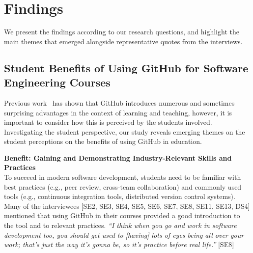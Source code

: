 \section{Findings} %
\label{sec:Findings}

We present the findings according to our research questions, and highlight the main themes that emerged alongside representative quotes from the interviews.

\subsection{Student Benefits of Using GitHub for Software Engineering Courses}
Previous work~\cite{zagalsky2015emergence} has shown that GitHub introduces numerous and sometimes surprising advantages in the context of learning and teaching, however, it is important to consider how this is perceived by the students involved. Investigating the student perspective, our study reveals emerging themes on the student perceptions on the benefits of using GitHub in education.


\textbf{Benefit: Gaining and Demonstrating Industry-Relevant Skills and Practices}\\
To succeed in modern software development, students need to be familiar with best practices (e.g., peer review, cross-team collaboration) and commonly used tools (e.g., continuous integration tools, distributed version control systems). Many of the interviewees [SE2, SE3, SE4, SE5, SE6, SE7, SE8, SE11, SE13, DS4] mentioned that using GitHub in their courses provided a good introduction to the tool and to relevant practices. \textit{``I think when you go and work in software development too, you should get used to [having] lots of eyes being all over your work; that's just the way it's gonna be, so it's practice before real life.''} [SE8]

